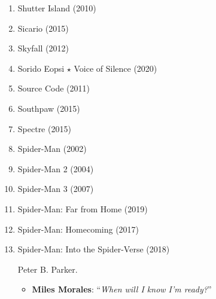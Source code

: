 \documentclass{article}
\begin{document}
\begin{enumerate}
	\item {\sc Shutter Island} (2010)
	\item {\sc Sicario} (2015)
	\item {\sc Skyfall} (2012)
	\item {\sc Sorido Eopsi $\star$ Voice of Silence} (2020)
	\item {\sc Source Code} (2011)
	\item {\sc Southpaw} (2015)
	\item {\sc Spectre} (2015)
	\item {\sc Spider-Man} (2002)
	\item {\sc Spider-Man 2} (2004)
	\item {\sc Spider-Man 3} (2007)
	\item {\sc Spider-Man: Far from Home} (2019)
	\item {\sc Spider-Man: Homecoming} (2017)
	\item {\sc Spider-Man: Into the Spider-Verse} (2018)
	
	{\sc Peter B. Parker.}
	\begin{itemize}
		\item {\bf Miles Morales}: ``{\it When will I know I'm ready?}''
		

\end{itemize}
\end{enumerate}
\end{document}
